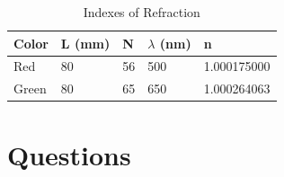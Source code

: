 \documentclass{amsart}
\begin{document}
\begin{table}[H]
    \centering
    \caption{Indexes of Refraction}
    \label{my-label}
    \begin{tabular}{@{}lllll@{}}\toprule
        Color & L (mm) & N  & $\lambda$ (nm) & n           \\ \midrule
        Red   & 80     & 56 & 500            & 1.000175000 \\
        Green & 80     & 65 & 650            & 1.000264063 \\
        \bottomrule
    \end{tabular}
\end{table}


%
%
\section{Questions}
\end{document}
